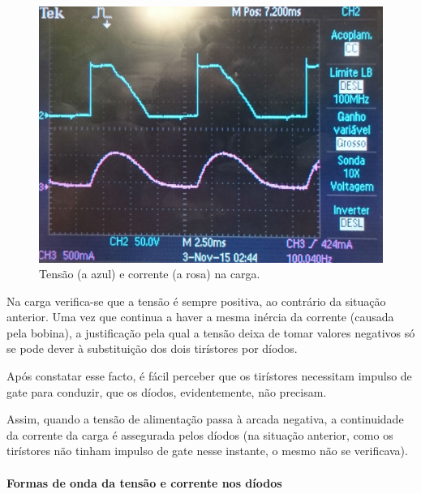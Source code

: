 \documentclass[a4paper,11pt]{article}
\numberwithin{equation}{section}
\begin{document}
\begin{figure}[H]
	\centering
	\includegraphics[keepaspectratio=true, scale=0.13]{img/DSC_0191}
	\caption{Tensão (a azul) e corrente (a rosa) na carga.}
	\label{fig:tccargasemi}
	\vspace{-0.8em}
\end{figure}

Na carga verifica-se que a tensão é sempre positiva, ao contrário da situação anterior. Uma vez que continua a haver a mesma inércia da corrente (causada pela bobina), a justificação pela qual a tensão deixa de tomar valores negativos só se pode dever à substituição dos dois tirístores por díodos.

Após constatar esse facto, é fácil perceber que os tirístores necessitam impulso de gate para conduzir, que os díodos, evidentemente, não precisam.

Assim, quando a tensão de alimentação passa à arcada negativa, a continuidade da corrente da carga é assegurada pelos díodos (na situação anterior, como os tirístores não tinham impulso de gate nesse instante, o mesmo não se verificava).

\paragraph{Formas de onda da tensão e corrente nos díodos} \mbox{}\
\end{document}
